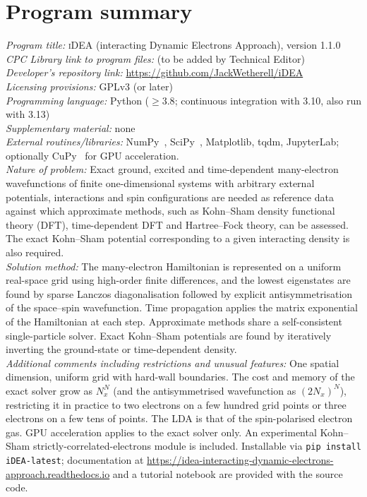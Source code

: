 \documentclass[5p,times,twocolumn]{elsarticle}
\newcommand{\iDEA}{\textsc{iDEA}}
\begin{document}
\section*{Program summary}
\noindent\emph{Program title:} \iDEA{} (interacting Dynamic Electrons Approach), version 1.1.0\\
\emph{CPC Library link to program files:} (to be added by Technical Editor)\\
\emph{Developer's repository link:} \url{https://github.com/JackWetherell/iDEA}\\
\emph{Licensing provisions:} GPLv3 (or later)\\
\emph{Programming language:} Python ($\geq 3.8$; continuous integration with 3.10, also run with 3.13)\\
\emph{Supplementary material:} none\\
\emph{External routines/libraries:} NumPy~\cite{NumPy}, SciPy~\cite{SciPy}, Matplotlib, tqdm, JupyterLab; optionally CuPy~\cite{CuPy} for GPU acceleration.\\
\emph{Nature of problem:} Exact ground, excited and time-dependent many-electron wavefunctions of finite one-dimensional systems with arbitrary external potentials, interactions and spin configurations are needed as reference data against which approximate methods, such as Kohn--Sham density functional theory (DFT), time-dependent DFT and Hartree--Fock theory, can be assessed. The exact Kohn--Sham potential corresponding to a given interacting density is also required.\\
\emph{Solution method:} The many-electron Hamiltonian is represented on a uniform real-space grid using high-order finite differences, and the lowest eigenstates are found by sparse Lanczos diagonalisation followed by explicit antisymmetrisation of the space--spin wavefunction. Time propagation applies the matrix exponential of the Hamiltonian at each step. Approximate methods share a self-consistent single-particle solver. Exact Kohn--Sham potentials are found by iteratively inverting the ground-state or time-dependent density.\\
\emph{Additional comments including restrictions and unusual features:} One spatial dimension, uniform grid with hard-wall boundaries. The cost and memory of the exact solver grow as $N_x^N$ (and the antisymmetrised wavefunction as $(2N_x)^N$), restricting it in practice to two electrons on a few hundred grid points or three electrons on a few tens of points. The LDA is that of the spin-polarised electron gas. GPU acceleration applies to the exact solver only. An experimental Kohn--Sham strictly-correlated-electrons module is included. Installable via \texttt{pip install iDEA-latest}; documentation at \url{https://idea-interacting-dynamic-electrons-approach.readthedocs.io} and a tutorial notebook are provided with the source code.
\end{document}
